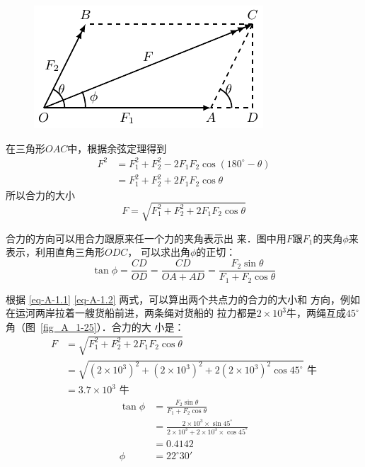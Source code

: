 \begin{figure}[htbp]
    \centering
    \includegraphics{fig/A/1-24.pdf} 
    \caption{} \label{fig_A_1-24} 
\end{figure} 


    在三角形$OAC$中，根据余弦定理得到
\[\begin{split} 
F^2 & = F_1^2+F_2^2-2F_1F_2\cos(180^\circ -\theta)  \\
&= F_1^2+F_2^2+2F_1F_2\cos\theta
\end{split}  \]
所以合力的大小
\begin{equation}\label{eq-A-1.1}
F=\sqrt{F_1^2+F_2^2+2F_1F_2\cos\theta} 
\end{equation} 

    合力的方向可以用合力跟原来任一个力的夹角表示出
来．图中用$F$跟$F_1$的夹角$\phi$来表示，利用直角三角形$ODC$，
可以求出角$\phi$的正切：
\begin{equation}\label{eq-A-1.2}
\tan\phi =\frac{CD} {OD} =\frac{CD} {OA+AD} =\frac{F_2\sin\theta } {F_1+F_2\cos\theta} 
\end{equation} 




    根据 \eqref{eq-A-1.1} \eqref{eq-A-1.2} 两式，可以算出两个共点力的合力的大小和
方向，例如在运河两岸拉着一艘货船前进，两条绳对货船的
拉力都是$2\times 10^3$牛，两绳互成$45^\circ$角（图~\ref{fig_A_1-25}）．合力的大
小是：
\[\begin{split} 
F&= \sqrt{F_1^2+F_2^2+2F_1F_2\cos\theta} \\
&=\sqrt{(2\times 10^3)^2+(2\times 10^3)^2+2(2\times 10^3)^2\cos 45^{\circ} } \text{ 牛} \\
&=3.7\times 10^3\text{ 牛} 
\end{split}  \]
\[\begin{split} 
\tan\phi&= \frac{F_2\sin\theta } {F_1+F_2\cos\theta} \\
&= \frac{2\times 10^3\times \sin 45^{\circ} } {2\times 10^3+2\times 10^3\times \cos 45^{\circ} }   \\
&=0.4142\\
\phi &= 22^{\circ}  30'
\end{split}  \]

